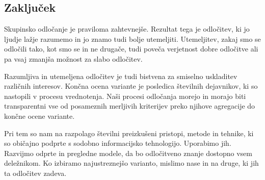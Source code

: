 \subsection{Zaključek}

Skupinsko odločanje je praviloma zahtevnejše. Rezultat tega je odločitev, ki jo ljudje lažje razumemo in jo znamo tudi bolje utemeljiti. Utemeljitev, zakaj smo se odločili tako, kot smo se in ne drugače, tudi poveča verjetnost dobre odločitve ali pa vsaj zmanjša možnost za slabo odločitev.

Razumljiva in utemeljena odločitev je tudi bistvena za smiselno uskladitev različnih interesov. Končna ocena variante je posledica številnih dejavnikov, ki so nastopili v procesu vrednotenja. Naši procesi odločanja morejo in morajo biti transparentni vse od posameznih merljivih kriterijev preko njihove agregacije do končne ocene variante.

Pri tem so nam na razpolago številni preizkušeni pristopi, metode in tehnike, ki so običajno podprte s sodobno informacijsko tehnologijo. Uporabimo jih. Razvijmo odprte in pregledne modele, da bo odločitveno znanje dostopno vsem deležnikom. Ko izbiramo najustreznejšo varianto, mislimo nase in na druge, ki jih ta odločitev zadeva.

